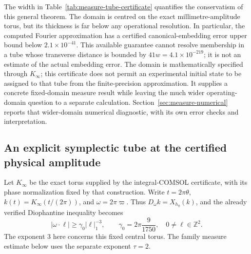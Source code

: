 The width in Table~\ref{tab:measure-tube-certificate} quantifies the
conservatism of this general theorem. The domain is centred on the exact
millimetre-amplitude torus, but its thickness is far below any operational
resolution. In particular, the computed Fourier approximation has a
certified canonical-embedding error upper bound below
$2.1\times10^{-41}$. This available guarantee cannot resolve membership
in a tube whose transverse distance is bounded by
$41w=4.1\times10^{-219}$; it is not an estimate of the actual embedding error.
The domain is mathematically specified
through $K_\infty$; this certificate does not permit an experimental
initial state to be assigned to that tube from the finite-precision
approximation. It supplies a concrete fixed-domain measure result while
leaving the much wider operating-domain question to a separate
calculation. Section~\ref{sec:measure-numerical} reports that wider-domain
numerical diagnostic, with its own error checks and interpretation.

\subsection{An explicit symplectic tube at the certified physical amplitude}
\label{sec:measure-explicit-tube}

Let $K_\infty$ be the exact torus supplied by the integral-COMSOL
certificate, with its phase normalization fixed by that construction.
Write $t=2\pi\theta$, $k(t)=K_\infty(t/(2\pi))$, and
$\omega=2\pi\varpi$. Thus $D_\omega k=X_{h_\eta}(k)$, and the
already verified Diophantine inequality becomes
\begin{equation}
 |\omega\cdot\ell|\geq\gamma_0|\ell|_1^{-3},\qquad
 \gamma_0=2\pi\frac9{1750},\quad
 0\ne\ell\in\mathbb Z^2.
 \label{eq:measure-centre-frequency}
\end{equation}
The exponent $3$ here concerns this fixed central torus. The family
measure estimate below uses the separate exponent $\tau=2$.

